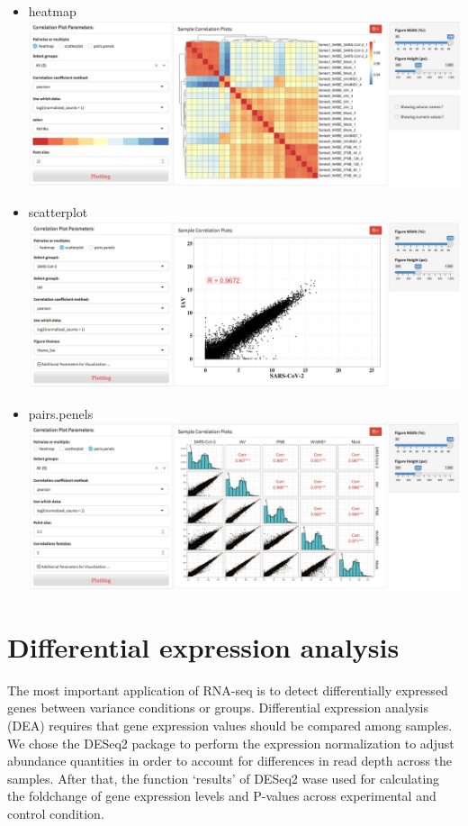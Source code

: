 \documentclass[
  a4paper,
  oneside]{book}
\begin{document}
\begin{itemize}
\item
  heatmap
  \includegraphics{images/quality_correlation.jpeg}
\item
  scatterplot
  \includegraphics{images/quality_correlation-scatter.jpeg}
\item
  pairs.penels
  \includegraphics{images/quality_correlation-mscatter.jpeg}
\end{itemize}

\hypertarget{differential-expression-analysis}{%
\chapter{Differential expression analysis}\label{differential-expression-analysis}}

The most important application of RNA-seq is to detect differentially expressed genes between variance conditions or groups. Differential expression analysis (DEA) requires that gene expression values should be compared among samples. We chose the DESeq2 package to perform the expression normalization to adjust abundance quantities in order to account for differences in read depth across the samples. After that, the function `results' of DESeq2 wase used for calculating the foldchange of gene expression levels and P-values across experimental and control condition.
\end{document}
